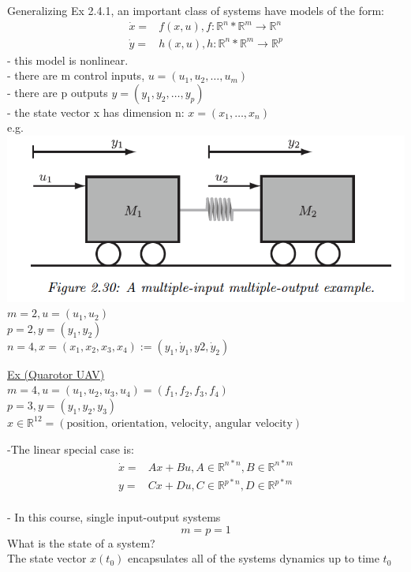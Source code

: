 \documentclass[letterpaper]{article}
\begin{document}
Generalizing Ex 2.4.1, an important class of systems have models of the form:
\begin{align*}
	\dot x= & f(x,u),f: \mathbb{R}^n*\mathbb{R}^m\rightarrow \mathbb{R}^n \\
	\dot y= & h(x,u), h:\mathbb{R}^n*\mathbb{R}^m\rightarrow \mathbb{R}^p 
\end{align*}
- this model is nonlinear.\\
- there are m control inputs, $u=(u_1,u_2,\hdots, u_m)$\\
- there are p outputs $y=(y_1,y_2,\hdots,y_p)$\\
- the state vector x has dimension n: $x=(x_1,\hdots,x_n)$\\

e.g.\\
\includegraphics[scale=0.8]{images/Figure_2_30.png}\\
$m=2, u=(u_1,u_2)$\\
$p=2, y=(y_1,y_2)$\\
$n=4, x=(x_1,x_2,x_3,x_4):=(y_1,\dot y_1, y2, \dot y_2)$

\underline{Ex (Quarotor UAV)}\\
$m=4, u=(u_1,u_2,u_3,u_4)=(f_1,f_2,f_3,f_4)$\\
$p=3,y=(y_1,y_2,y_3)$\\
$x\in \mathbb R^{12}=(\text{position, orientation, velocity, angular velocity})$

-The linear special case is:
\begin{align*}
	\dot x= & Ax+Bu, A\in \mathbb{R}^{n*n},B\in \mathbb{R}^{n*m}  \\
	y=      & Cx+Du, C\in \mathbb{R}^{p*n}, D\in \mathbb{R}^{p*m} \\
\end{align*}

- In this course, single input-output systems $$m=p=1$$
What is the state of a system? \\
The state vector $x(t_0)$ encapsulates all of the systems dynamics up to time $t_0$
\end{document}

